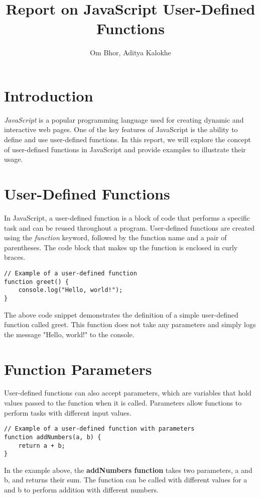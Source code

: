 \documentclass{article}
\title{Report on JavaScript User-Defined Functions}
\author{Om Bhor, Aditya Kalokhe}
\begin{document}
\maketitle

\section{Introduction}
\textit{JavaScript} is a popular programming language used for creating dynamic and interactive web pages. One of the key features of JavaScript is the ability to define and use user-defined functions. In this report, we will explore the concept of user-defined functions in JavaScript and provide examples to illustrate their usage.

\section{User-Defined Functions}
In JavaScript, a user-defined function is a block of code that performs a specific task and can be reused throughout a program. User-defined functions are created using the \textit{function} keyword, followed by the function name and a pair of parentheses. The code block that makes up the function is enclosed in curly braces.

\begin{lstlisting}
// Example of a user-defined function
function greet() {
    console.log("Hello, world!");
}
\end{lstlisting}

The above code snippet demonstrates the definition of a simple user-defined function called greet. This function does not take any parameters and simply logs the message "Hello, world!" to the console.
\section{Function Parameters}

User-defined functions can also accept parameters, which are variables that hold values passed to the function when it is called. Parameters allow functions to perform tasks with different input values.

\begin{lstlisting}
// Example of a user-defined function with parameters
function addNumbers(a, b) {
    return a + b;
}
\end{lstlisting}

In the example above, the \textbf{addNumbers function} takes two parameters, a and b, and returns their sum. The function can be called with different values for a and b to perform addition with different numbers.
\end{document}

